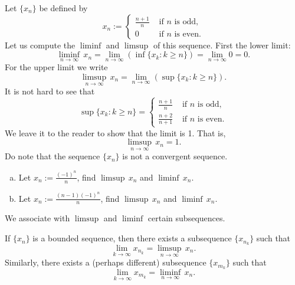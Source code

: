 \documentclass[12pt]{book}
\begin{document}
\begin{example}
Let $\{ x_n \}$ be defined by
\begin{equation*}
x_n :=
\begin{cases}
\frac{n+1}{n} & \text{ if $n$ is odd,} \\
0 & \text{ if $n$ is even.}
\end{cases}
\end{equation*}
Let us compute the $\liminf$ and $\limsup$ of this sequence.
First  the
lower limit:
\begin{equation*}
\liminf_{n\to\infty} \, x_n = 
\lim_{n\to\infty}
\left(
\inf \{ x_k : k \geq n \}
\right)
=
\lim_{n\to\infty} 0 = 0 .
\end{equation*}
For the upper limit we write
\begin{equation*}
\limsup_{n\to\infty} \, x_n = 
\lim_{n\to\infty}
\left(
\sup \{ x_k : k \geq n \}
\right) .
\end{equation*}
It is not hard to see that
\begin{equation*}
\sup \{ x_k : k \geq n \} =
\begin{cases}
\frac{n+1}{n} & \text{ if $n$ is odd,} \\
\frac{n+2}{n+1} & \text{ if $n$ is even.}
\end{cases}
\end{equation*}
We leave it to the reader to show that the limit is 1.
That is,
\begin{equation*}
\limsup_{n\to\infty} \, x_n = 1 .
\end{equation*}
Do note that the sequence $\{ x_n \}$ is not a convergent sequence.
\end{example}

\begin{exercise}
\begin{enumerate}[a)]
\item
Let $x_n := \tfrac{{(-1)}^n}{n}$, find $\limsup \, x_n$ and $\liminf \, x_n$.
\item
Let $x_n := \tfrac{(n-1){(-1)}^n}{n}$, find $\limsup \, x_n$ and $\liminf \, x_n$.
\end{enumerate}
\end{exercise}

We associate with $\limsup$ and $\liminf$ certain subsequences.

\begin{thm} \label{subseqlimsupinf:thm}
If $\{ x_n \}$ is a bounded sequence, then there exists a subsequence
$\{ x_{n_k} \}$ such that
\begin{equation*}
\lim_{k\to \infty} x_{n_k} = \limsup_{n \to \infty} \, x_n .
\end{equation*}
Similarly, there exists a (perhaps different) subsequence
$\{ x_{m_k} \}$ such that
\begin{equation*}
\lim_{k\to \infty} x_{m_k} = \liminf_{n \to \infty} \, x_n .
\end{equation*}
\end{thm}
\end{document}
